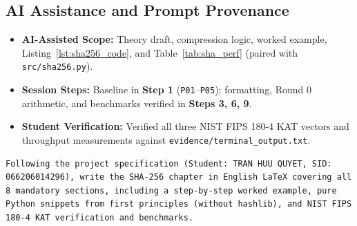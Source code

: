 \subsection*{AI Assistance and Prompt Provenance}
\begin{itemize}
    \item \textbf{AI-Assisted Scope:} Theory draft, compression logic, worked example, Listing~\ref{lst:sha256_code}, and Table~\ref{tab:sha_perf} (paired with \texttt{src/sha256.py}).
    \item \textbf{Session Steps:} Baseline in \textbf{Step 1} (\texttt{P01}--\texttt{P05}); formatting, Round 0 arithmetic, and benchmarks verified in \textbf{Steps 3, 6, 9}.
    \item \textbf{Student Verification:} Verified all three NIST FIPS 180-4 KAT vectors and throughput measurements against \texttt{evidence/\allowbreak terminal\_output.txt}.
\end{itemize}
\begin{lstlisting}[style=promptstyle, caption={Compact Prompt (R-REP-03) for Chapter 3: SHA-256.}, label={lst:prompt_ch3}]
Following the project specification (Student: TRAN HUU QUYET, SID: 066206014296), write the SHA-256 chapter in English LaTeX covering all 8 mandatory sections, including a step-by-step worked example, pure Python snippets from first principles (without hashlib), and NIST FIPS 180-4 KAT verification and benchmarks.
\end{lstlisting}
